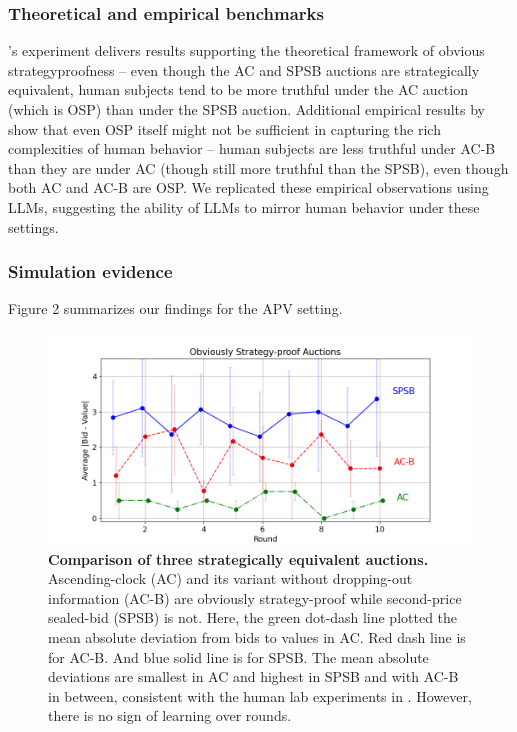 \documentclass{article} %
\begin{document}
\subsubsection{Theoretical and empirical benchmarks}
\citet{li2017obviously}'s experiment delivers results supporting the theoretical framework of obvious strategyproofness -- even though the AC and SPSB auctions are strategically equivalent, human subjects tend to be more truthful under the AC auction (which is OSP) than under the SPSB auction. 
Additional empirical results by \citet{breitmoser2022obviousness} show that even OSP itself might not be sufficient in capturing the rich complexities of human behavior -- human subjects are less truthful under AC-B than they are under AC (though still more truthful than the SPSB), even though both AC and AC-B are OSP. 
We replicated these empirical observations using LLMs, suggesting the ability of LLMs to mirror human behavior under these settings.


\subsubsection{Simulation evidence}
Figure 2 summarizes our findings for the APV setting. 

\begin{figure}[h]  
    \centering  
\includegraphics[width=\linewidth]{Figs/OSP.png}  
    \caption{\textbf{Comparison of three strategically equivalent auctions.} Ascending-clock (AC) and its variant without dropping-out information (AC-B) are obviously strategy-proof while second-price sealed-bid (SPSB) is not. Here, the green dot-dash line plotted the mean absolute deviation from bids to values in AC. Red dash line is for AC-B. And blue solid line is for SPSB. The mean absolute deviations are smallest in AC and highest in SPSB and with AC-B in between, consistent with the human lab experiments in \cite{breitmoser2022obviousness}. However, there is no sign of learning over rounds.}
    
    \label{fig:osp}
\end{figure}
\end{document}
